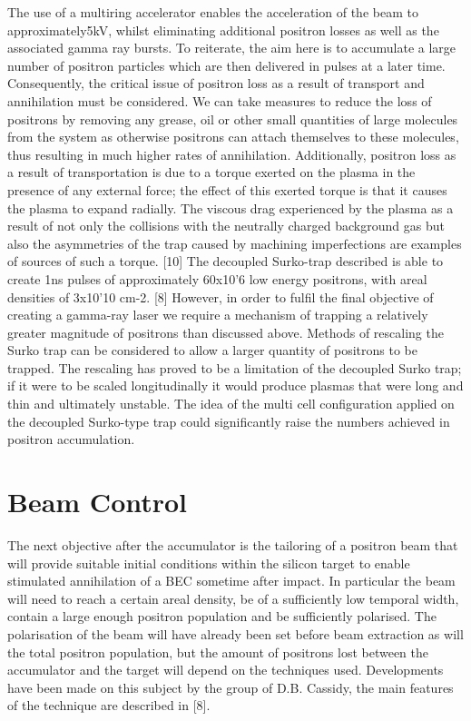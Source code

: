 The use of a multiring accelerator enables the acceleration of the beam to approximately5kV, whilst eliminating additional positron losses as well as the associated gamma ray bursts.
To reiterate, the aim here is to accumulate a large number of positron particles which are then delivered in pulses at a later time. Consequently, the critical issue of positron loss as a result of transport and annihilation must be considered. We can take measures to reduce the loss of positrons by removing any grease, oil or other small quantities of large molecules from the system as otherwise positrons can attach themselves to these molecules, thus resulting in much higher rates of annihilation. Additionally, positron loss as a result of transportation is due to a torque exerted on the plasma in the presence of any external force; the effect of this exerted torque is that it causes the plasma to expand radially. The viscous drag experienced by the plasma as a result of not only the collisions with the neutrally charged background gas but also the asymmetries of the trap caused by machining imperfections are examples of sources of such a torque. [10]
The decoupled Surko-trap described is able to create 1ns pulses of approximately 60x10'6 low energy positrons, with areal densities of 3x10'10 cm-2. [8] However, in order to fulfil the final objective of creating a gamma-ray laser we require a mechanism of trapping a relatively greater magnitude of positrons than discussed above. Methods of rescaling the Surko trap can be considered to allow a larger quantity of positrons to be trapped. The rescaling has proved to be a limitation of the decoupled Surko trap; if it were to be scaled longitudinally it would produce plasmas that were long and thin and ultimately unstable. The idea of the multi cell configuration applied on the decoupled Surko-type trap could significantly raise the numbers achieved in positron accumulation.


\section{Beam Control}
The next objective after the accumulator is the tailoring of a positron beam that will provide suitable initial conditions within the silicon target to enable stimulated annihilation of a BEC sometime after impact. In particular the beam will need to reach a certain areal density, be of a sufficiently low temporal width, contain a large enough positron population and be sufficiently polarised. The polarisation of the beam will have already been set before beam extraction as will the total positron population, but the amount of positrons lost between the accumulator and the target will depend on the techniques used. Developments have been made on this subject by the group of D.B. Cassidy, the main features of the technique are described in [8].

